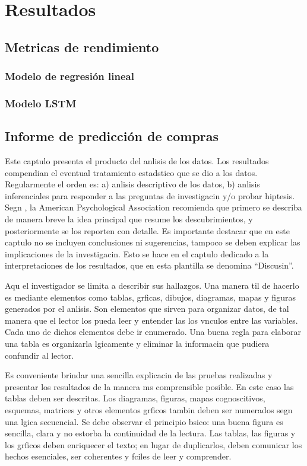 \fancyhead{}
\fancyfoot{}
\cfoot{\thepage}


\chapter{Resultados}

\section{Metricas de rendimiento}
\subsection{Modelo de regresión lineal}
\subsection{Modelo LSTM}

\section{Informe de predicción de compras}


Este captulo presenta el producto del anlisis de los datos. Los resultados compendian el eventual tratamiento estadstico que se dio a los datos. Regularmente el orden es: a) anlisis descriptivo de los datos, b) anlisis inferenciales para responder a las preguntas de investigacin y/o probar hiptesis. Segn \cite{sampieri}, la American Psychological Association recomienda que primero se describa de manera breve la idea principal que resume los descubrimientos, y posteriormente se los reporten con detalle. Es importante destacar que en este captulo no se incluyen conclusiones ni sugerencias, tampoco se deben explicar las implicaciones de la investigacin. Esto se hace en el captulo dedicado a la interpretaciones de los resultados, que en esta plantilla se denomina ``Discusin''.

Aqu el investigador se limita a describir sus hallazgos. Una manera til de hacerlo es mediante elementos como tablas, grficas, dibujos, diagramas, mapas y figuras generados por el anlisis. Son elementos que sirven para organizar datos, de tal manera que el lector los pueda leer y entender las los vnculos entre las variables. Cada uno de dichos elementos debe ir enumerado. Una buena regla para elaborar una tabla es organizarla lgicamente y eliminar la informacin que pudiera confundir al lector.

Es conveniente brindar una sencilla explicacin de las pruebas realizadas y presentar los resultados de la manera ms comprensible posible. En este caso las tablas deben ser descritas. Los diagramas, figuras, mapas cognoscitivos, esquemas, matrices y otros elementos grficos tambin deben ser numerados segn una  lgica secuencial. Se debe observar el principio bsico: una buena figura es sencilla, clara y no estorba la continuidad de la lectura. Las tablas, las figuras y los grficos deben enriquecer el texto; en lugar de duplicarlos, deben comunicar los hechos esenciales, ser coherentes y fciles de leer y comprender. 

